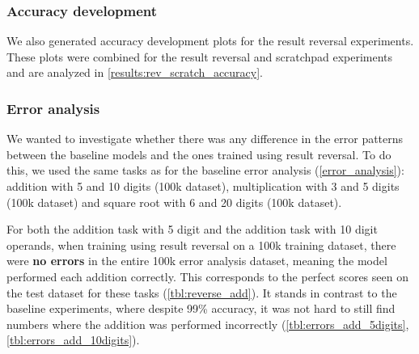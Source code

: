 \begin{table}[!htbp]
	\begin{minipage}[t]{0.47\linewidth}
		\hfill
		\label{tbl:reverse_sqrt_baseline}
	\end{minipage}
	\hfill %
	\begin{minipage}[t]{0.47\linewidth}
		\hfill
		\label{tbl:reverse_sqrt}
	\end{minipage}
\end{table}

\FloatBarrier
\subsubsection{Accuracy development}

We also generated accuracy development plots for the result reversal experiments. These plots were combined for the result reversal and scratchpad experiments and are analyzed in \cref{results:rev_scratch_accuracy}.


\FloatBarrier
\subsubsection{Error analysis}

We wanted to investigate whether there was any difference in the error patterns between the baseline models and the ones trained using result reversal. To do this, we used the same tasks as for the baseline error analysis (\cref{error_analysis}): addition with 5 and 10 digits (100k dataset), multiplication with 3 and 5 digits (100k dataset) and square root with 6 and 20 digits (100k dataset).

For both the addition task with 5 digit and the addition task with 10 digit operands, when training using result reversal on a 100k training dataset, there were \textbf{no errors} in the entire 100k error analysis dataset, meaning the model performed each addition correctly. This corresponds to the perfect scores seen on the test dataset for these tasks (\cref{tbl:reverse_add}).
It stands in contrast to the baseline experiments, where despite 99\% accuracy, it was not hard to still find numbers where the addition was performed incorrectly (\cref{tbl:errors_add_5digits}, \cref{tbl:errors_add_10digits}).


